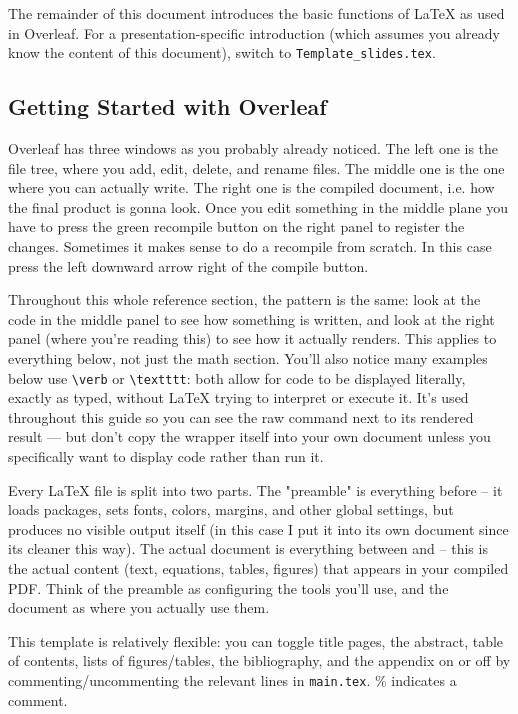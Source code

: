 The remainder of this document introduces the basic functions of LaTeX as used in Overleaf. For a presentation-specific introduction (which assumes you already know the content of this document), switch to \texttt{Template\_slides.tex}.



\newpage



\subsection*{Getting Started with Overleaf}

Overleaf has three windows as you probably already noticed. The left one is the file tree, where you add, edit, delete, and rename files. The middle one is the one where you can actually write. The right one is the compiled document, i.e. how the final product is gonna look. Once you edit something in the middle plane you have to press the green recompile button on the right panel to register the changes. Sometimes it makes sense to do a recompile from scratch. In this case press the left downward arrow right of the compile button.

Throughout this whole reference section, the pattern is the same: look at the code in the middle panel to see how something is written, and look at the right panel (where you're reading this) to see how it actually renders. This applies to everything below, not just the math section. You'll also notice many examples below use \verb|\verb| or \verb|\textttt|: both allow for code to be displayed literally, exactly as typed, without LaTeX trying to interpret or execute it. It's used throughout this guide so you can see the raw command next to its rendered result --- but don't copy the wrapper itself into your own document unless you specifically want to display code rather than run it.

Every LaTeX file is split into two parts. The "preamble" is everything before \verb|| -- it loads packages, sets fonts, colors, margins, and other global settings, but produces no visible output itself (in this case I put it into its own document since its cleaner this way). The actual document is everything between \verb|| and \verb|| -- this is the actual content (text, equations, tables, figures) that appears in your compiled PDF. Think of the preamble as configuring the tools you'll use, and the document as where you actually use them.

This template is relatively flexible: you can toggle title pages, the abstract, table of contents, lists of figures/tables, the bibliography, and the appendix on or off by commenting/uncommenting the relevant \verb|| lines in \texttt{main.tex}. \% indicates a comment.

